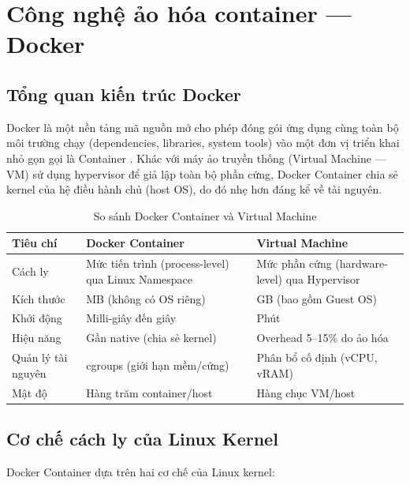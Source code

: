\section{Công nghệ ảo hóa container --- Docker}

\subsection{Tổng quan kiến trúc Docker}

Docker là một nền tảng mã nguồn mở cho phép đóng gói ứng dụng cùng toàn bộ môi trường chạy (dependencies, libraries, system tools) vào một đơn vị triển khai nhỏ gọn gọi là Container \cite{docker2023docs}. Khác với máy ảo truyền thống (Virtual Machine --- VM) sử dụng hypervisor để giả lập toàn bộ phần cứng, Docker Container chia sẻ kernel của hệ điều hành chủ (host OS), do đó nhẹ hơn đáng kể về tài nguyên.

\begin{table}[H]
\centering
\caption{So sánh Docker Container và Virtual Machine}
\label{tab:docker_vs_vm}
\begin{tabular}{|l|p{5cm}|p{5.5cm}|}
\hline
\textbf{Tiêu chí} & \textbf{Docker Container} & \textbf{Virtual Machine} \\ \hline
Cách ly & Mức tiến trình (process-level) qua Linux Namespace & Mức phần cứng (hardware-level) qua Hypervisor \\ \hline
Kích thước & MB (không có OS riêng) & GB (bao gồm Guest OS) \\ \hline
Khởi động & Milli-giây đến giây & Phút \\ \hline
Hiệu năng & Gần native (chia sẻ kernel) & Overhead 5--15\% do ảo hóa \\ \hline
Quản lý tài nguyên & cgroups (giới hạn mềm/cứng) & Phân bổ cố định (vCPU, vRAM) \\ \hline
Mật độ & Hàng trăm container/host & Hàng chục VM/host \\ \hline
\end{tabular}
\end{table}

\subsection{Cơ chế cách ly của Linux Kernel}

Docker Container dựa trên hai cơ chế của Linux kernel:

